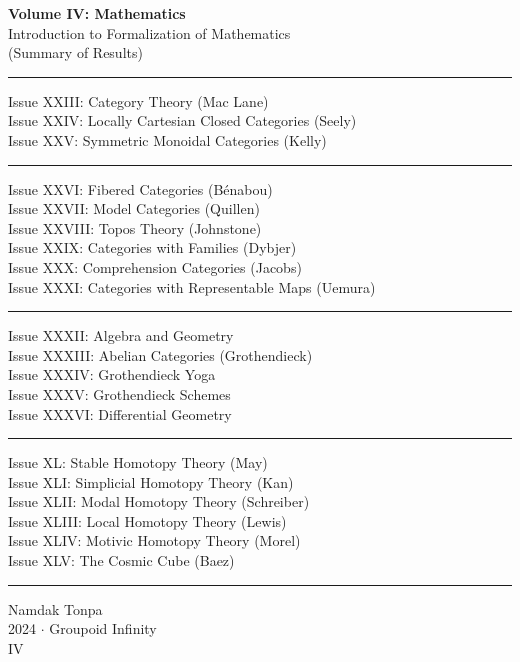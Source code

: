 \documentclass{article}
\begin{document}
\begin{titlepage}
    \centering
    \vspace*{0.5in}
    \Huge
    \textbf{Volume IV: Mathematics} \\
    \LARGE
    Introduction to Formalization of Mathematics \\
    (Summary of Results) \\
    \vspace{1.5in}
    \small
    \flushleft
    \vspace{-2mm} \rule{\textwidth}{0.4pt}
    Issue XXIII: Category Theory (Mac Lane) \\
    Issue XXIV: Locally Cartesian Closed Categories (Seely) \\
    Issue XXV: Symmetric Monoidal Categories (Kelly) \\
    \vspace{-2mm} \rule{\textwidth}{0.4pt}
    Issue XXVI: Fibered Categories (Bénabou) \\
    Issue XXVII: Model Categories (Quillen) \\
    Issue XXVIII: Topos Theory (Johnstone) \\
    Issue XXIX: Categories with Families (Dybjer) \\
    Issue XXX: Comprehension Categories (Jacobs) \\
    Issue XXXI: Categories with Representable Maps (Uemura) \\
    \vspace{-2mm} \rule{\textwidth}{0.4pt}
    Issue XXXII: Algebra and Geometry \\
    Issue XXXIII: Abelian Categories (Grothendieck) \\
    Issue XXXIV: Grothendieck Yoga \\
    Issue XXXV: Grothendieck Schemes \\
    Issue XXXVI: Differential Geometry \\
    \vspace{-2mm} \rule{\textwidth}{0.4pt}
    Issue XL: Stable Homotopy Theory (May) \\
    Issue XLI: Simplicial Homotopy Theory (Kan) \\
    Issue XLII: Modal Homotopy Theory (Schreiber) \\
    Issue XLIII: Local Homotopy Theory (Lewis) \\
    Issue XLIV: Motivic Homotopy Theory (Morel) \\
    Issue XLV: The Cosmic Cube (Baez) \\
    \vspace{-2mm} \rule{\textwidth}{0.4pt}
    \centering
    \vfill
    \large
    Namdak Tonpa \\
    \Large
    2024 $\cdot$ Groupoid Infinity \\
    IV
\end{titlepage}
\end{document}
